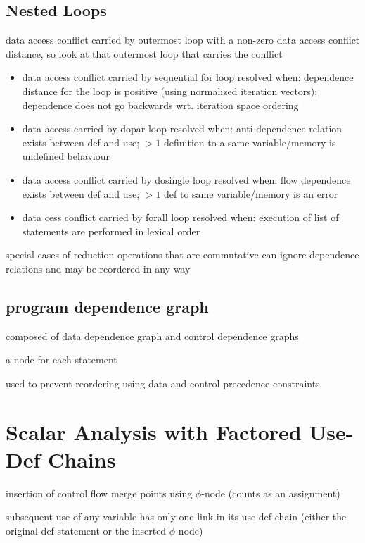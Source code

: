 \documentclass[8pt]{extarticle}
\begin{document}
\begin{multicols*}{2}
  \subsection{Nested Loops}

  data access conflict carried by outermost loop with a non-zero data access conflict distance, so look at that outermost loop that carries the conflict

  \begin{itemize}
  \item data access conflict carried by sequential for loop resolved when: dependence distance for the loop is positive (using normalized iteration vectors); dependence does not go backwards wrt. iteration space ordering
  \item data access carried by dopar loop resolved when: anti-dependence relation exists between def and use; $>1$ definition to a same variable/memory is undefined behaviour
  \item data access conflict carried by dosingle loop resolved when: flow dependence exists between def and use; $>1$ def to same variable/memory is an error
  \item data cess conflict carried by forall loop resolved when: execution of list of statements are performed in lexical order
  \end{itemize}

  special cases of reduction operations that are commutative can ignore dependence relations and may be reordered in any way
  
  \subsection{program dependence graph}

  composed of data dependence graph and control dependence graphs

  a node for each statement

  used to prevent reordering using data and control precedence constraints

  \section{Scalar Analysis with Factored Use-Def Chains}

  insertion of control flow merge points using $\phi$-node (counts as an assignment)

  subsequent use of any variable has only one link in its use-def chain (either the original def statement or the inserted $\phi$-node)


\end{multicols*}
\end{document}
